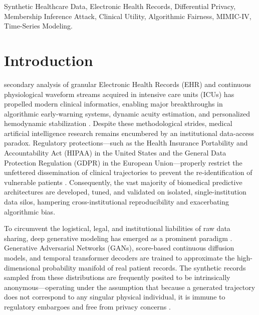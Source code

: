 \documentclass[journal]{IEEEtran}
\begin{document}
\begin{abstract}
\end{abstract}

\begin{IEEEkeywords}
Synthetic Healthcare Data, Electronic Health Records, Differential Privacy, Membership Inference Attack, Clinical Utility, Algorithmic Fairness, MIMIC-IV, Time-Series Modeling.
\end{IEEEkeywords}

\section{Introduction}
 secondary analysis of granular Electronic Health Records (EHR) and continuous physiological waveform streams acquired in intensive care units (ICUs) has propelled modern clinical informatics, enabling major breakthroughs in algorithmic early-warning systems, dynamic acuity estimation, and personalized hemodynamic stabilization \cite{johnson2023mimic, rajkomar2018scalable}. Despite these methodological strides, medical artificial intelligence research remains encumbered by an institutional data-access paradox. Regulatory protections---such as the Health Insurance Portability and Accountability Act (HIPAA) in the United States and the General Data Protection Regulation (GDPR) in the European Union---properly restrict the unfettered dissemination of clinical trajectories to prevent the re-identification of vulnerable patients \cite{price2019privacy}. Consequently, the vast majority of biomedical predictive architectures are developed, tuned, and validated on isolated, single-institution data silos, hampering cross-institutional reproducibility and exacerbating algorithmic bias.

To circumvent the logistical, legal, and institutional liabilities of raw data sharing, deep generative modeling has emerged as a prominent paradigm \cite{choi2017generating, yoon2019timegan}. Generative Adversarial Networks (GANs), score-based continuous diffusion models, and temporal transformer decoders are trained to approximate the high-dimensional probability manifold of real patient records. The synthetic records sampled from these distributions are frequently posited to be intrinsically anonymous---operating under the assumption that because a generated trajectory does not correspond to any singular physical individual, it is immune to regulatory embargoes and free from privacy concerns \cite{hernandez2022synthetic}.
\end{document}
